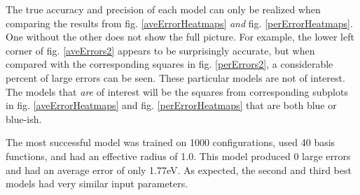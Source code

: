 \par The true accuracy and precision of each model can only be realized when comparing the results from fig. \ref{aveErrorHeatmaps} \textit{and} fig. \ref{perErrorHeatmaps}. One without the other does not show the full picture. For example, the lower left corner of fig. \ref{aveErrors2} appears to be surprisingly accurate, but when compared with the corresponding squares in fig. \ref{perErrors2}, a considerable percent of large errors can be seen. These particular models are not of interest. The models that \textit{are} of interest will be the squares from corresponding subplots in fig. \ref{aveErrorHeatmaps} and fig. \ref{perErrorHeatmaps} that are both blue or blue-ish. 
\par The most successful model was trained on 1000 configurations, used 40 basis functions, and had an effective radius of 1.0. This model produced 0 large errors and had an average error of only 1.77eV. As expected, the second and third best models had very similar input parameters.
